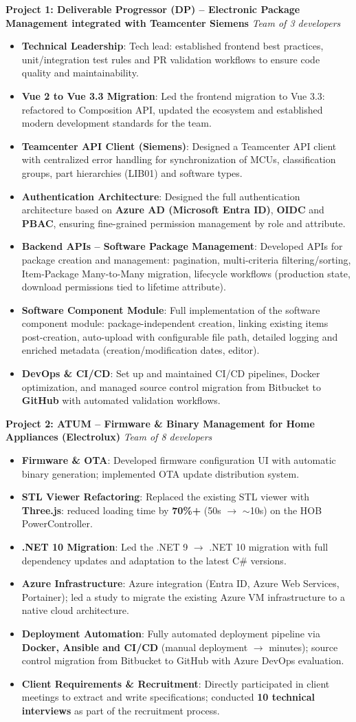 \documentclass[a4paper,20pt]{article}
\newcommand{\resumeItem}[2]{
  \item\small{
    \textbf{#1}{: #2 \vspace{-2pt}}
  }
}
\newcommand{\resumeItemListStart}{\begin{itemize}}
\newcommand{\resumeItemListEnd}{\end{itemize}\vspace{-5pt}}
\begin{document}
    \vspace{4pt}
    \textbf{Project 1: Deliverable Progressor (DP) -- Electronic Package Management integrated with Teamcenter Siemens} \hfill \textit{Team of 3 developers}
    \resumeItemListStart
        \resumeItem{Technical Leadership}{Tech lead: established frontend best practices, unit/integration test rules and PR validation workflows to ensure code quality and maintainability.}
        \resumeItem{Vue 2 to Vue 3.3 Migration}{Led the frontend migration to Vue 3.3: refactored to Composition API, updated the ecosystem and established modern development standards for the team.}
        \resumeItem{Teamcenter API Client (Siemens)}{Designed a Teamcenter API client with centralized error handling for synchronization of MCUs, classification groups, part hierarchies (LIB01) and software types.}
        \resumeItem{Authentication Architecture}{Designed the full authentication architecture based on \textbf{Azure AD (Microsoft Entra ID)}, \textbf{OIDC} and \textbf{PBAC}, ensuring fine-grained permission management by role and attribute.}
        \resumeItem{Backend APIs -- Software Package Management}{Developed APIs for package creation and management: pagination, multi-criteria filtering/sorting, Item-Package Many-to-Many migration, lifecycle workflows (production state, download permissions tied to lifetime attribute).}
        \resumeItem{Software Component Module}{Full implementation of the software component module: package-independent creation, linking existing items post-creation, auto-upload with configurable file path, detailed logging and enriched metadata (creation/modification dates, editor).}
        \resumeItem{DevOps \& CI/CD}{Set up and maintained CI/CD pipelines, Docker optimization, and managed source control migration from Bitbucket to \textbf{GitHub} with automated validation workflows.}
    \resumeItemListEnd

    \vspace{4pt}
    \textbf{Project 2: ATUM -- Firmware \& Binary Management for Home Appliances (Electrolux)} \hfill \textit{Team of 8 developers}
    \resumeItemListStart
        \resumeItem{Firmware \& OTA}{Developed firmware configuration UI with automatic binary generation; implemented OTA update distribution system.}
        \resumeItem{STL Viewer Refactoring}{Replaced the existing STL viewer with \textbf{Three.js}: reduced loading time by \textbf{70\%+} (50s $\rightarrow$ $\sim$10s) on the HOB PowerController.}
        \resumeItem{.NET 10 Migration}{Led the .NET 9 $\rightarrow$ .NET 10 migration with full dependency updates and adaptation to the latest C\# versions.}
        \resumeItem{Azure Infrastructure}{Azure integration (Entra ID, Azure Web Services, Portainer); led a study to migrate the existing Azure VM infrastructure to a native cloud architecture.}
        \resumeItem{Deployment Automation}{Fully automated deployment pipeline via \textbf{Docker, Ansible and CI/CD} (manual deployment $\rightarrow$ minutes); source control migration from Bitbucket to GitHub with Azure DevOps evaluation.}
        \resumeItem{Client Requirements \& Recruitment}{Directly participated in client meetings to extract and write specifications; conducted \textbf{10 technical interviews} as part of the recruitment process.}
    \resumeItemListEnd
\end{document}
